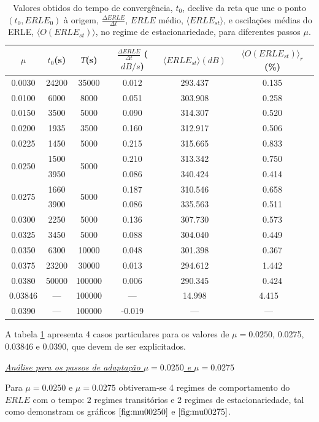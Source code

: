 \documentclass[a4paper,11pt]{report}
\begin{document}
\begin{table}[h]
\centering
\begin{tabular}{ || c | c | c | c | c | c || }
\hline
	$\mu$ & $t_0$(s) & $T$(s) & $\frac{\Delta ERLE}{\Delta t}$ ($dB/s$) & $\langle ERLE_{st}\rangle (dB)$ & $\langle O(ERLE_{st})\rangle_r$ (\%) \\ \hline  \hline
	0.0030 & 24200 & 35000 & 0.012 & 293.437 & 0.135   \\ \hline
	0.0100 & 6000 & 8000 & 0.051 & 303.908 & 0.258   \\ \hline
	0.0150 & 3500 & 5000 & 0.090 & 314.307 & 0.520   \\ \hline
	0.0200 & 1935 & 3500 & 0.160 & 312.917 & 0.506   \\ \hline
	0.0225 & 1450 & 5000 & 0.215 & 315.665 & 0.833  \\ \hline
	\multirow{2}{*}{0.0250} & 1500 & \multirow{2}{*}{5000} & 0.210 & 313.342 & 0.750   \\ \hhline{~-~---}
	 & 3950 &  & 0.086 & 340.424 & 0.414   \\ \hline
	\multirow{2}{*}{0.0275} & 1660 & \multirow{2}{*}{5000} & 0.187 & 310.546 & 0.658   \\ \hhline{~-~---}
	 & 3900 &  & 0.086 & 335.563 & 0.511  \\ \hline
	0.0300 & 2250 & 5000 & 0.136 & 307.730 & 0.573  \\ \hline
	0.0325 & 3450 & 5000 & 0.088 & 304.040 & 0.449   \\ \hline
	0.0350 & 6300 & 10000 & 0.048 & 301.398& 0.367   \\ \hline
	0.0375 & 23200 & 30000 & 0.013 & 294.612 & 1.442   \\ \hline
	0.0380 & 50000 & 100000 & 0.006 & 290.345& 0.424   \\ \hline
	0.03846 & --- & 100000 & --- & 14.998 & 4.415  \  \\ \hline
	0.0390 & --- & 100000 & -0.019 & --- & ---  \  \\ \hline
\end{tabular}

\caption{Valores obtidos do tempo de convergência, $t_{0}$, declive da reta que une o ponto $(t_0,ERLE_{0})$ à origem, $\frac{\Delta ERLE}{\Delta t}$, $ERLE$ médio, $\langle ERLE_{st}\rangle$, e oscilações médias do ERLE, $\langle O(ERLE_{st})\rangle$, no regime de estacionariedade, para diferentes passos $\mu$.\label{tab:mu}}

\end{table}

A tabela \ref{tab:mu} apresenta 4 casos particulares para os valores de $\mu=0.0250$, 0.0275, 0.03846 e 0.0390, que devem de ser explicitados. \\
\par
\large\underline{{\textit{{Análise para os passos de adaptação $\mu=0.0250$ e $\mu=0.0275$}}}}\\
\par
Para $\mu=0.0250$ e $\mu=0.0275$ obtiveram-se 4 regimes de comportamento do $ERLE$ com o tempo: 2 regimes transitórios e 2 regimes de estacionariedade, tal como demonstram os gráficos $\ref{fig:mu00250}$ e $\ref{fig:mu00275}$.
\end{document}
